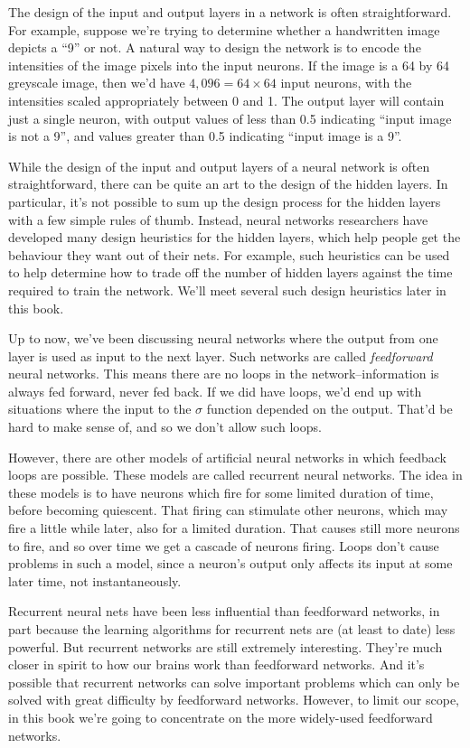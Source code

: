 \documentclass[a4paper,twoside,10pt]{book}
\begin{document}
The design of the input and output layers in a network is often straightforward. For example, suppose we're trying to determine whether a handwritten image depicts a ``9'' or not. A natural way to design the network is to encode the intensities of the image pixels into the input neurons. If the image is a 64 by 64 greyscale image, then we'd have $4,096=64\times64$ input neurons, with the intensities scaled appropriately between 0 and 1. The output layer will contain just a single neuron, with output values of less than 0.5 indicating ``input image is not a 9'', and values greater than 0.5 indicating ``input image is a 9''.

While the design of the input and output layers of a neural network is often straightforward, there can be quite an art to the design of the hidden layers. In particular, it's not possible to sum up the design process for the hidden layers with a few simple rules of thumb. Instead, neural networks researchers have developed many design heuristics for the hidden layers, which help people get the behaviour they want out of their nets. For example, such heuristics can be used to help determine how to trade off the number of hidden layers against the time required to train the network. We'll meet several such design heuristics later in this book.

Up to now, we've been discussing neural networks where the output from one layer is used as input to the next layer. Such networks are called \textit{feedforward} neural networks. This means there are no loops in the network--information is always fed forward, never fed back. If we did have loops, we'd end up with situations where the input to the $\sigma$ function depended on the output. That'd be hard to make sense of, and so we don't allow such loops.

However, there are other models of artificial neural networks in which feedback loops are possible. These models are called recurrent neural networks. The idea in these models is to have neurons which fire for some limited duration of time, before becoming quiescent. That firing can stimulate other neurons, which may fire a little while later, also for a limited duration. That causes still more neurons to fire, and so over time we get a cascade of neurons firing. Loops don't cause problems in such a model, since a neuron's output only affects its input at some later time, not instantaneously.

Recurrent neural nets have been less influential than feedforward networks, in part because the learning algorithms for recurrent nets are (at least to date) less powerful. But recurrent networks are still extremely interesting. They're much closer in spirit to how our brains work than feedforward networks. And it's possible that recurrent networks can solve important problems which can only be solved with great difficulty by feedforward networks. However, to limit our scope, in this book we're going to concentrate on the more widely-used feedforward networks.
\end{document}
